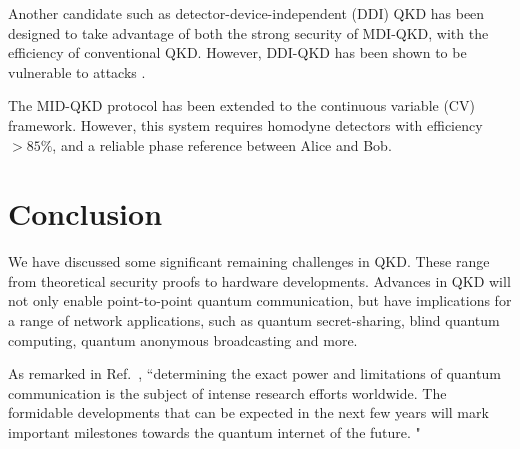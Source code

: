 \documentclass[reprint,
superscriptaddress,
 amsmath,amssymb,
 aps,
prb,
]{revtex4-1}
\begin{document}
Another candidate such as 
detector-device-independent\cite{lim2014detector,PhysRevA.92.022337} (DDI) QKD has been designed to take advantage of both the strong security of MDI-QKD, with the efficiency of conventional QKD. However, DDI-QKD has been shown to be vulnerable to attacks \cite{PhysRevLett.117.250505}. 

The MID-QKD protocol has been extended to the continuous variable (CV) framework. However, this system requires homodyne detectors with efficiency $> 85\%$, and a reliable phase reference between Alice and Bob.  


\section{Conclusion}

We have discussed some significant remaining challenges in QKD.
These range from theoretical security proofs to hardware developments.
Advances in QKD will not only enable point-to-point quantum communication,
but have implications for a range of network applications, such as
quantum secret-sharing\cite{cleve1999share,PhysRevA.61.042311,PhysRevA.71.044301}, blind quantum computing\cite{broadbent2009universal,barz2012demonstration}, quantum anonymous
broadcasting\cite{christandl2005quantum} and more.

As remarked in Ref.~\cite{diamanti2016practical},
``determining the exact power and limitations of quantum
communication is the subject of intense research efforts worldwide.
The formidable developments that can be expected in the
next few years will mark important milestones towards the
quantum internet of the future. "  




\begin{eqnarray}
\end{eqnarray}
\end{document}
